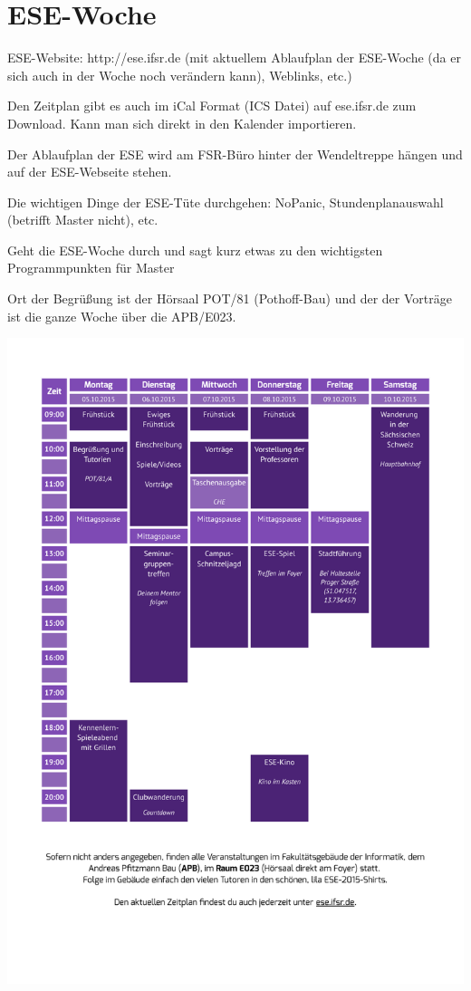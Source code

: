 \documentclass[a4paper,12pt]{report}
\begin{document}
\section{ESE-Woche}
\begin{itemize*}
\item ESE-Website: http://ese.ifsr.de (mit aktuellem Ablaufplan der ESE-Woche (da er sich auch in der Woche noch verändern kann), Weblinks, etc.)
\item Den Zeitplan gibt es auch im iCal Format (ICS Datei) auf ese.ifsr.de zum Download.
Kann man sich direkt in den Kalender importieren.
\item Der Ablaufplan der ESE wird am FSR-Büro hinter der Wendeltreppe hängen und auf der ESE-Webseite stehen.
\item Die wichtigen Dinge der ESE-Tüte durchgehen: NoPanic, Stundenplanauswahl (betrifft Master nicht), etc.
\item Geht die ESE-Woche durch und sagt kurz etwas zu den wichtigsten Programmpunkten für Master
\end{itemize*}
\vspace{0.5cm}
Ort der Begrüßung ist der Hörsaal POT/81 (Pothoff-Bau) und der der Vorträge ist die ganze Woche über die APB/E023.

\includegraphics[width=\linewidth]{./zeitplan_2015.pdf}
\end{document}
